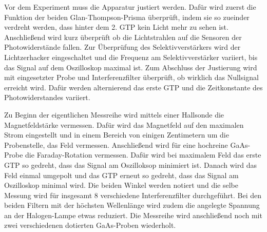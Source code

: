Vor dem Experiment muss die Apparatur justiert werden. Dafür wird zuerst die Funktion
der beiden Glan-Thompson-Prisma überprüft, indem sie so zueinder verdreht werden,
dass hinter dem 2. GTP kein Licht mehr zu sehen ist. Anschließend wird kurz überprüft
ob die Lichtstrahlen auf die Sensoren der Photowiderstände fallen. Zur Überprüfung
des Selektivverstärkers wird der Lichtzerhacker eingeschaltet und die Frequenz
am Selektivverstärker variiert, bis das Signal auf dem Oszilloskop maximal ist.
Zum Abschluss der Justierung wird mit eingesetzter Probe und Interferenzfilter
überprüft, ob wirklich das Nullsignal erreicht wird. Dafür werden alternierend
das erste GTP und die Zeitkonstante des Photowiderstandes variiert.

Zu Beginn der eigentlichen Messreihe wird mittels einer Hallsonde die Magnetfeldstärke
vermessen. Dafür wird das Magnetfeld auf den maximalen Strom eingestellt und in einem
Bereich von einigen Zentimetern um die Probenstelle, das Feld vermessen. Anschließend
wird für eine hochreine GaAs-Probe die Faraday-Rotation vermessen. Dafür wird
bei maximalem Feld das erste GTP so gedreht, dass das Signal am Oszilloksop
minimiert ist. Danach wird das Feld einmal umgepolt und das GTP erneut so gedreht,
dass das Signal am Oszilloskop minimal wird. Die beiden Winkel werden notiert und
die selbe Messung wird für insgesamt 8 verschiedene Interferenzfilter
durchgeführt. Bei den beiden Filtern mit der höchsten Wellenlänge wird zudem
die angelegte Spannung an der Halogen-Lampe etwas reduziert. Die Messreihe wird
anschließend noch mit zwei verschiedenen dotierten GaAs-Proben wiederholt.

